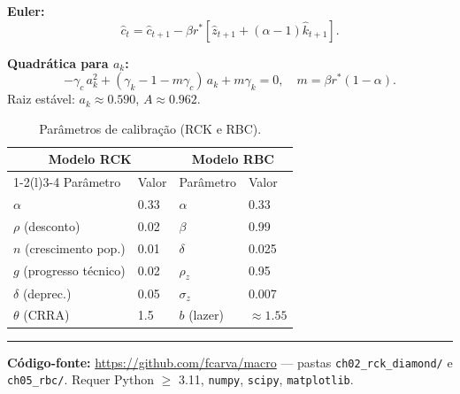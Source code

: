 \documentclass[12pt, a4paper]{article}
\newcommand{\khat}{\hat{k}}
\newcommand{\chat}{\hat{c}}
\newcommand{\zhat}{\hat{z}}
\newcommand{\rstar}{r^*}
\begin{document}
\textbf{Euler:}
\[
\chat_t = \chat_{t+1} - \beta\rstar[\zhat_{t+1}+(\alpha-1)\khat_{t+1}].
\]

\textbf{Quadrática para $a_k$:}
\[
-\gamma_c\,a_k^2 + (\gamma_k - 1 - m\gamma_c)\,a_k + m\gamma_k = 0,
\quad m = \beta\rstar(1-\alpha).
\]
Raiz estável: $a_k\approx 0.590$, $A\approx 0.962$.

\begin{table}[H]
\centering
\caption{Parâmetros de calibração (RCK e RBC).}
\begin{tabular}{llll}
\toprule
\multicolumn{2}{c}{Modelo RCK} & \multicolumn{2}{c}{Modelo RBC} \\
\cmidrule(r){1-2}\cmidrule(l){3-4}
Parâmetro & Valor & Parâmetro & Valor \\
\midrule
$\alpha$ & 0.33 & $\alpha$ & 0.33 \\
$\rho$ (desconto) & 0.02 & $\beta$ & 0.99 \\
$n$ (crescimento pop.) & 0.01 & $\delta$ & 0.025 \\
$g$ (progresso técnico) & 0.02 & $\rho_z$ & 0.95 \\
$\delta$ (deprec.) & 0.05 & $\sigma_z$ & 0.007 \\
$\theta$ (CRRA) & 1.5 & $b$ (lazer) & $\approx 1.55$ \\
\bottomrule
\end{tabular}
\end{table}

\bigskip
\hrule
\vspace{1em}
{\footnotesize
\textbf{Código-fonte:} \url{https://github.com/fcarva/macro} ---
pastas \texttt{ch02\_rck\_diamond/} e \texttt{ch05\_rbc/}.
Requer Python $\geq$ 3.11, \texttt{numpy}, \texttt{scipy}, \texttt{matplotlib}.
}
\end{document}
